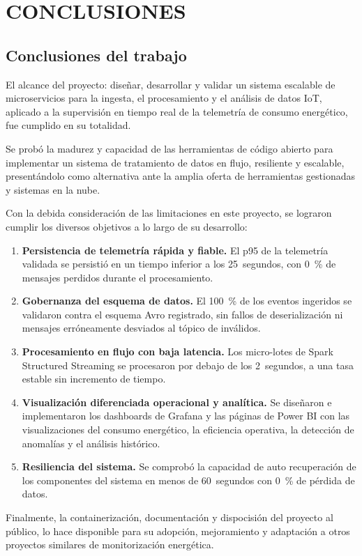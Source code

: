 \chapter{CONCLUSIONES}

\section{Conclusiones del trabajo}

El alcance del proyecto: diseñar, desarrollar y validar un sistema escalable de microservicios para la ingesta, el procesamiento y el análisis de datos IoT, aplicado a la supervisión en tiempo real de la telemetría de consumo energético, fue cumplido en su totalidad.

Se probó la madurez y capacidad de las herramientas de código abierto para implementar un sistema de tratamiento de datos en flujo, resiliente y escalable, presentándolo como alternativa ante la amplia oferta de herramientas gestionadas y sistemas en la nube.

Con la debida consideración de las limitaciones en este proyecto, se lograron cumplir los diversos objetivos a lo largo de su desarrollo:

\begin{enumerate}
  \item \textbf{Persistencia de telemetría rápida y fiable.} El p95 de la telemetría validada se persistió en un tiempo inferior a los 25~segundos, con 0~\% de mensajes perdidos durante el procesamiento.
  \item \textbf{Gobernanza del esquema de datos.} El 100~\% de los eventos ingeridos se validaron contra el esquema Avro registrado, sin fallos de deserialización ni mensajes erróneamente desviados al tópico de inválidos.
  \item \textbf{Procesamiento en flujo con baja latencia.} Los micro-lotes de Spark Structured Streaming se procesaron por debajo de los 2~segundos, a una tasa estable sin incremento de tiempo.
  \item \textbf{Visualización diferenciada operacional y analítica.} Se diseñaron e implementaron los dashboards de Grafana y las páginas de Power BI con las visualizaciones del consumo energético, la eficiencia operativa, la detección de anomalías y el análisis histórico.
  \item \textbf{Resiliencia del sistema.} Se comprobó la capacidad de auto recuperación de los componentes del sistema en menos de 60~segundos con 0~\% de pérdida de datos.
\end{enumerate}

Finalmente, la containerización, documentación y dispocisión del proyecto al público, lo hace disponible para su adopción, mejoramiento y adaptación a otros proyectos similares de monitorización energética.
